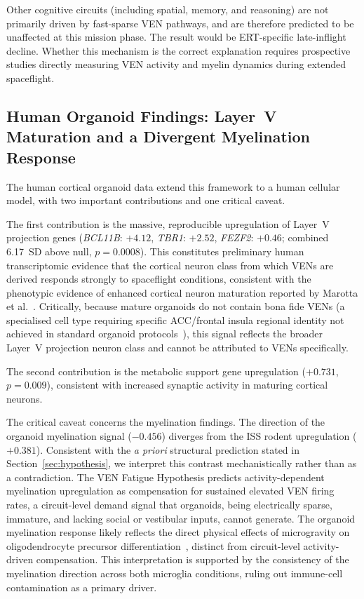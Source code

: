 \documentclass[11pt]{article}
\begin{document}
Other cognitive circuits (including spatial, memory, and reasoning) are not
primarily driven by fast-sparse VEN pathways, and are therefore predicted
to be unaffected at this mission phase.
The result would be ERT-specific late-inflight decline.
Whether this mechanism is the correct explanation requires prospective
studies directly measuring VEN activity and myelin dynamics during
extended spaceflight.

\subsection{Human Organoid Findings: Layer~V Maturation and a Divergent
Myelination Response}
\label{sec:disc_org}

The human cortical organoid data extend this framework to a human cellular
model, with two important contributions and one critical caveat.

The first contribution is the massive, reproducible upregulation of Layer~V
projection genes (\textit{BCL11B}: $+4.12$, \textit{TBR1}: $+2.52$,
\textit{FEZF2}: $+0.46$; combined 6.17~SD above null, $p=0.0008$).
This constitutes preliminary human transcriptomic evidence that the cortical
neuron class from which VENs are derived responds strongly to spaceflight
conditions, consistent with the phenotypic evidence of enhanced cortical
neuron maturation reported by Marotta et al.~\cite{marotta2024}.
Critically, because mature organoids do not contain bona fide VENs (a
specialised cell type requiring specific ACC/frontal insula regional identity
not achieved in standard organoid protocols~\cite{allman2010}), this signal
reflects the broader Layer~V projection neuron class and cannot be attributed
to VENs specifically.

The second contribution is the metabolic support gene upregulation
($+0.731$, $p=0.009$), consistent with increased synaptic activity
in maturing cortical neurons.

The critical caveat concerns the myelination findings.
The direction of the organoid myelination signal ($-0.456$) diverges from
the ISS rodent upregulation ($+0.381$).
Consistent with the \textit{a priori} structural prediction stated in
Section~\ref{sec:hypothesis}, we interpret this contrast mechanistically
rather than as a contradiction.
The VEN Fatigue Hypothesis predicts activity-dependent myelination
upregulation as compensation for sustained elevated VEN firing rates, a
circuit-level demand signal that organoids, being electrically sparse,
immature, and lacking social or vestibular inputs, cannot generate.
The organoid myelination response likely reflects the direct physical
effects of microgravity on oligodendrocyte precursor
differentiation~\cite{marotta2024}, distinct from circuit-level
activity-driven compensation.
This interpretation is supported by the consistency of the myelination
direction across both microglia conditions, ruling out immune-cell
contamination as a primary driver.
\end{document}
